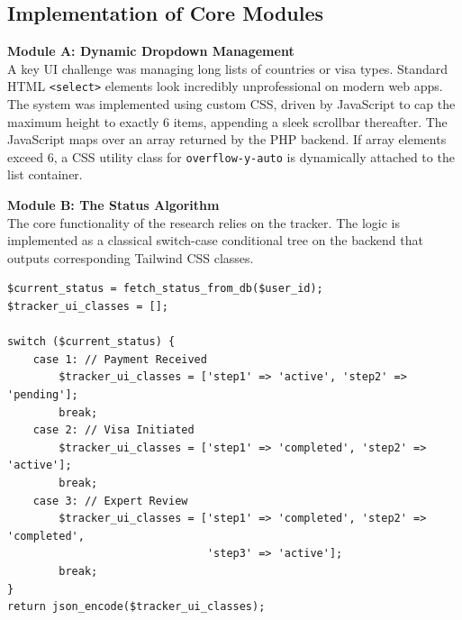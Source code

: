 \documentclass[12pt, a4paper]{article}
\begin{document}
\subsection{Implementation of Core Modules}
\textbf{Module A: Dynamic Dropdown Management}\\
A key UI challenge was managing long lists of countries or visa types. Standard HTML \texttt{<select>} elements look incredibly unprofessional on modern web apps. The system was implemented using custom CSS, driven by JavaScript to cap the maximum height to exactly 6 items, appending a sleek scrollbar thereafter. The JavaScript maps over an array returned by the PHP backend. If array elements exceed 6, a CSS utility class for \texttt{overflow-y-auto} is dynamically attached to the list container. 

\textbf{Module B: The Status Algorithm}\\
The core functionality of the research relies on the tracker. The logic is implemented as a classical switch-case conditional tree on the backend that outputs corresponding Tailwind CSS classes.

\begin{lstlisting}[backgroundcolor=\color{lightgray}, basicstyle=\ttfamily\small, frame=single, title=Conceptual Pseudo-Code of Tracker Logic]
$current_status = fetch_status_from_db($user_id); 
$tracker_ui_classes = [];

switch ($current_status) {
    case 1: // Payment Received
        $tracker_ui_classes = ['step1' => 'active', 'step2' => 'pending'];
        break;
    case 2: // Visa Initiated
        $tracker_ui_classes = ['step1' => 'completed', 'step2' => 'active'];
        break;
    case 3: // Expert Review
        $tracker_ui_classes = ['step1' => 'completed', 'step2' => 'completed', 
                               'step3' => 'active'];
        break;
}
return json_encode($tracker_ui_classes);
\end{lstlisting}
\end{document}
